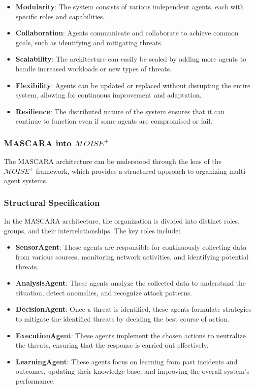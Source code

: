 \documentclass[conference]{IEEEtran}
\newcounter{relation}
\begin{document}
\begin{itemize}
    \item \textbf{Modularity}: The system consists of various independent agents, each with specific roles and capabilities.
    \item \textbf{Collaboration}: Agents communicate and collaborate to achieve common goals, such as identifying and mitigating threats.
    \item \textbf{Scalability}: The architecture can easily be scaled by adding more agents to handle increased workloads or new types of threats.
    \item \textbf{Flexibility}: Agents can be updated or replaced without disrupting the entire system, allowing for continuous improvement and adaptation.
    \item \textbf{Resilience}: The distributed nature of the system ensures that it can continue to function even if some agents are compromised or fail.
\end{itemize}

\subsubsection{MASCARA into $\mathcal{M}OISE^+$}

The MASCARA architecture can be understood through the lens of the $\mathcal{M}OISE^+$ framework, which provides a structured approach to organizing multi-agent systems.

\subsubsection*{Structural Specification}

In the MASCARA architecture, the organization is divided into distinct roles, groups, and their interrelationships. The key roles include:

\begin{itemize}
    \item \textbf{SensorAgent}: These agents are responsible for continuously collecting data from various sources, monitoring network activities, and identifying potential threats.
    \item \textbf{AnalysisAgent}: These agents analyze the collected data to understand the situation, detect anomalies, and recognize attack patterns.
    \item \textbf{DecisionAgent}: Once a threat is identified, these agents formulate strategies to mitigate the identified threats by deciding the best course of action.
    \item \textbf{ExecutionAgent}: These agents implement the chosen actions to neutralize the threats, ensuring that the response is carried out effectively.
    \item \textbf{LearningAgent}: These agents focus on learning from past incidents and outcomes, updating their knowledge base, and improving the overall system's performance.
\end{itemize}
\end{document}
